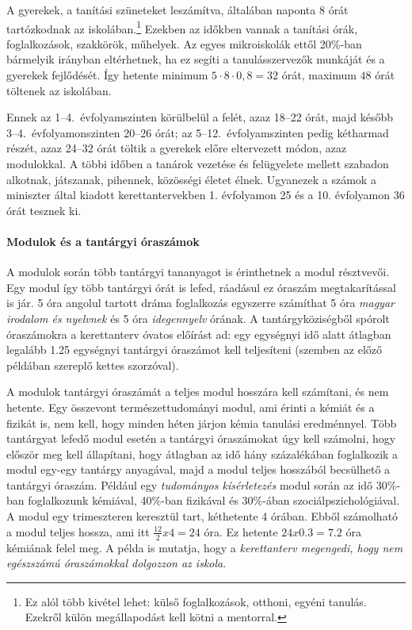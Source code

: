 A gyerekek, a tanítási szüneteket leszámítva, általában naponta 8 órát tartózkodnak az iskolában.\footnote{Ez alól több kivétel lehet: külső foglalkozások, otthoni, egyéni tanulás. Ezekről külön megállapodást kell kötni a mentorral.} Ezekben az időkben vannak a tanítási órák, foglalkozások, szakkörök, műhelyek. Az egyes mikroiskolák ettől 20\%-ban bármelyik irányban eltérhetnek, ha ez segíti a tanulásszervezők munkáját és a gyerekek fejlődését. Így hetente minimum $5 \cdot 8 \cdot 0,8 = 32$ órát, maximum $48$ órát töltenek az iskolában.

Ennek az 1--4.~évfolyamszinten körülbelül a felét, azaz 18--22 órát, majd később 3--4.~évfolyamonszinten 20--26 órát; az 5--12.~évfolyamszinten pedig kétharmad részét, azaz 24--32 órát töltik a gyerekek előre eltervezett módon, azaz modulokkal. A többi időben a tanárok vezetése és felügyelete mellett szabadon alkotnak, játszanak, pihennek, közösségi életet élnek. Ugyanezek a számok a miniszter által kiadott kerettantervekben 1. évfolyamon 25 és a 10. évfolyamon 36 órát tesznek ki.

\paragraph{Modulok és a tantárgyi óraszámok}
A modulok során több tantárgyi tananyagot is érinthetnek a modul résztvevői. Egy modul így több tantárgyi órát is lefed, ráadásul ez óraszám megtakarítással is jár. 5 óra angolul tartott dráma foglalkozás egyszerre számíthat 5 óra \emph{magyar irodalom és nyelvnek} és 5 óra \emph{idegennyelv} órának. A tantárgyköziségből spórolt óraszámokra a kerettanterv óvatos előírást ad: egy egységnyi idő alatt átlagban legalább 1.25 egységnyi tantárgyi óraszámot kell teljesíteni (szemben az előző példában szereplő kettes szorzóval).

A modulok tantárgyi óraszámát a teljes modul hosszára kell számítani, és nem hetente. Egy összevont természettudományi modul, ami érinti a kémiát és a fizikát is, nem kell, hogy minden héten járjon kémia tanulási eredménnyel. Több tantárgyat lefedő modul esetén a tantárgyi óraszámokat úgy kell számolni, hogy először meg kell állapítani, hogy átlagban az idő hány százalékában foglalkozik a modul egy-egy tantárgy anyagával, majd a modul teljes hosszából becsülhető a tantárgyi óraszám. Például egy \emph{tudományos kísérletezés} modul során az idő 30\%-ban foglalkozunk kémiával, 40\%-ban fizikával és 30\%-ában szociálpszichológiával. A modul egy trimeszteren keresztül tart, kéthetente 4 órában. Ebből számolható a modul teljes hossza, ami itt $\frac{12}{2}x4 = 24$ óra. Ez hetente $24x0.3 = 7.2$ óra kémiának felel meg. 
A példa is mutatja, hogy a \emph{kerettanterv megengedi, hogy nem egészszámú óraszámokkal dolgozzon az iskola}. 

